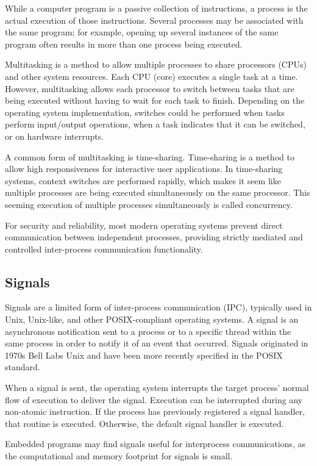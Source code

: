 \documentclass{article}
\begin{document}
			While a computer program is a passive collection of instructions, a process is the actual execution of those instructions. Several processes may be associated with the same program; for example, opening up several instances of the same program often results in more than one process being executed.

			Multitasking is a method to allow multiple processes to share processors (CPUs) and other system resources. Each CPU (core) executes a single task at a time. However, multitasking allows each processor to switch between tasks that are being executed without having to wait for each task to finish. Depending on the operating system implementation, switches could be performed when tasks perform input/output operations, when a task indicates that it can be switched, or on hardware interrupts.

			A common form of multitasking is time-sharing. Time-sharing is a method to allow high responsiveness for interactive user applications. In time-sharing systems, context switches are performed rapidly, which makes it seem like multiple processes are being executed simultaneously on the same processor. This seeming execution of multiple processes simultaneously is called concurrency.

			For security and reliability, most modern operating systems prevent direct communication between independent processes, providing strictly mediated and controlled inter-process communication functionality.

		\subsection{Signals}
			Signals are a limited form of inter-process communication (IPC), typically used in Unix, Unix-like, and other POSIX-compliant operating systems. A signal is an asynchronous notification sent to a process or to a specific thread within the same process in order to notify it of an event that occurred. Signals originated in 1970s Bell Labs Unix and have been more recently specified in the POSIX standard.

			When a signal is sent, the operating system interrupts the target process' normal flow of execution to deliver the signal. Execution can be interrupted during any non-atomic instruction. If the process has previously registered a signal handler, that routine is executed. Otherwise, the default signal handler is executed.

			Embedded programs may find signals useful for interprocess communications, as the computational and memory footprint for signals is small.
\end{document}
